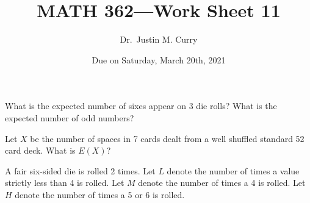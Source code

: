 \documentclass[addpoints,12pt]{exam}
\title{\vspace{-1in} MATH 362---Work Sheet 11}
\date{Due on Saturday, March 20th, 2021}
\author{Dr.~Justin M. Curry}
\begin{document}
\maketitle


\begin{questions}

\question[1] What is the expected number of sixes appear on 3 die rolls? What is the expected number of odd numbers?

\vspace{.7in}

\question[1] Let $X$ be the number of spaces in 7 cards dealt from a well shuffled standard 52 card deck. What is $E(X)$?

\vspace{1in}

\question[6] A fair six-sided die is rolled 2 times. Let $L$ denote the number of times a value strictly less than 4 is rolled. Let $M$ denote the number of times a 4 is rolled. Let $H$ denote the number of times a 5 or 6 is rolled.

\noaddpoints
{}
\addpoints


\end{questions}
\end{document}
